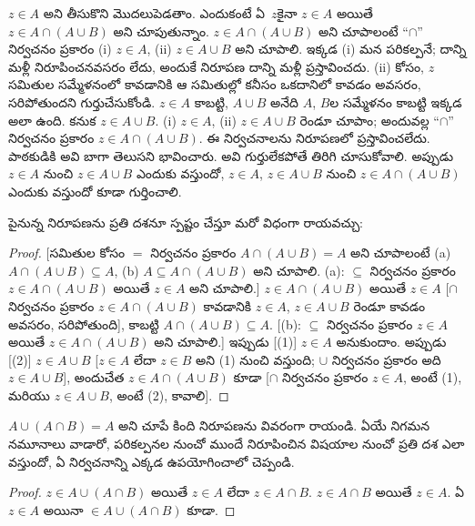 \documentclass[../../../include/open-logic-section]{subfiles}
\begin{document}
$z \in A$ అని తీసుకొని మొదలుపెడతాం. ఎందుకంటే ఏ~$z$కైనా $z \in A$ అయితే $z \in A \cap (A \cup B)$ అని చూపుతున్నాం. $z
\in A \cap (A \cup B)$ అని చూపాలంటే ``$\cap$'' నిర్వచనం ప్రకారం (i) $z \in A$, (ii) $z \in A \cup B$ అని చూపాలి. ఇక్కడ (i) మన పరికల్పనే; దాన్ని మళ్లీ నిరూపించనవసరం లేదు, అందుకే నిరూపణ దాన్ని మళ్లీ ప్రస్తావించదు. (ii) కోసం, $z$ సమితుల సమ్మేళనంలో  కావడానికి ఆ సమితుల్లో కనీసం ఒకదానిలో  కావడం అవసరం, సరిపోతుందని గుర్తుచేసుకోండి. $z \in A$ కాబట్టి, $A \cup B$ అనేది $A$, $B$ల సమ్మేళనం కాబట్టి ఇక్కడ అలా ఉంది. కనుక $z \in A \cup B$. (i) $z \in A$, (ii) $z \in A \cup B$ రెండూ చూపాం; అందువల్ల ``$\cap$'' నిర్వచనం ప్రకారం $z \in A \cap (A \cup B)$. ఈ నిర్వచనాలను నిరూపణలో ప్రస్తావించలేదు. పాఠకుడికి అవి బాగా తెలుసని భావించారు. అవి గుర్తులేకపోతే తిరిగి చూసుకోవాలి. అప్పుడు $z
\in A$ నుంచి $z \in A \cup B$ ఎందుకు వస్తుందో, $z \in A$, $z \in A \cup B$ నుంచి $z \in A \cap (A \cup B)$ ఎందుకు వస్తుందో కూడా గుర్తించాలి.

పైనున్న నిరూపణను ప్రతి దశనూ స్పష్టం చేస్తూ మరో విధంగా రాయవచ్చు:
\begin{proof}{}
[సమితుల కోసం $=$ నిర్వచనం ప్రకారం $A \cap (A \cup B) = A$ అని చూపాలంటే (a) $A \cap (A \cup B) \subseteq A$, (b) $A \subseteq A \cap (A \cup B)$ అని చూపాలి. (a): $\subseteq$ నిర్వచనం ప్రకారం $z \in A \cap (A \cup B)$ అయితే $z \in A$ అని చూపాలి.] $z \in A
\cap (A \cup B)$ అయితే $z \in A$ [$\cap$ నిర్వచనం ప్రకారం $z
  \in A \cap (A \cup B)$ కావడానికి $z \in A$, $z \in A \cup B$ రెండూ కావడం అవసరం, సరిపోతుంది], కాబట్టి $A
\cap (A \cup B) \subseteq A$. [(b): $\subseteq$ నిర్వచనం ప్రకారం $z \in A$ అయితే $z \in A \cap (A \cup B)$ అని చూపాలి.] ఇప్పుడు [(1)] $z \in A$ అనుకుందాం. అప్పుడు [(2)] $z \in A \cup B$ [$z \in A$ లేదా $z \in B$ అని (1) నుంచి వస్తుంది; $\cup$ నిర్వచనం ప్రకారం అది $z
  \in A \cup B$], అందుచేత $z \in A \cap (A \cup B)$ కూడా [$\cap$ నిర్వచనం ప్రకారం $z \in A$, అంటే (1), మరియు $z
  \in A \cup B$, అంటే (2), కావాలి].
\end{proof}

\begin{prob}
$A \cup (A \cap B) = A$ అని చూపే కింది నిరూపణను వివరంగా రాయండి. ఏయే నిగమన నమూనాలు వాడారో, పరికల్పనల నుంచో ముందే నిరూపించిన విషయాల నుంచో ప్రతి దశ ఎలా వస్తుందో, ఏ నిర్వచనాన్ని ఎక్కడ ఉపయోగించాలో చెప్పండి.
\begin{proof}
  $z \in A \cup (A \cap B)$ అయితే $z \in A$ లేదా $z \in A \cap B$. $z \in A \cap B$ అయితే $z \in A$. ఏ $z \in A$ అయినా $\in A \cup (A
  \cap B)$ కూడా.
\end{proof}
\end{prob}
\end{document}
